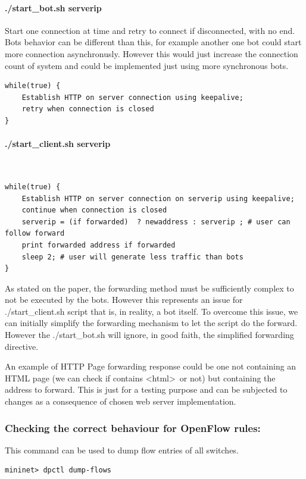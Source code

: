 \paragraph{./start\_bot.sh serverip}
Start one connection at time and retry to connect if disconnected, with no end. Bots behavior can be different than this, for example another one bot could start more connection asynchronusly. However this would just increase the connection count of system and could be implemented just using more synchronous bots.
\begin{lstlisting}[caption={./start\_bot.sh pseudo code},captionpos=b]
while(true) {
	Establish HTTP on server connection using keepalive;
	retry when connection is closed
}
\end{lstlisting}

\paragraph{./start\_client.sh serverip}\
\begin{lstlisting}[caption={./start\_client.sh pseudo code},captionpos=b]
while(true) {
	Establish HTTP on server connection on serverip using keepalive;
	continue when connection is closed
	serverip = (if forwarded)  ? newaddress : serverip ; # user can follow forward
	print forwarded address if forwarded
	sleep 2; # user will generate less traffic than bots
}

\end{lstlisting}

As stated on the paper, the forwarding method must be sufficiently complex to not be executed by the bots. However this represents an issue for ./start\_client.sh script that is, in reality, a bot itself. To overcome this issue, we can initially simplify the forwarding mechanism to let the script do the forward. However the ./start\_bot.sh will ignore, in good faith, the simplified forwarding directive.

An example of HTTP Page forwarding response could be one not containing an HTML page (we can check if contains \textless html\textgreater\ or not) but containing the address to forward. This is just for a testing purpose and can be subjected to changes as a consequence of chosen web server implementation.

\subsubsection{Checking the correct behaviour for OpenFlow rules:}
This command can be used to dump flow entries of all switches.
\begin{lstlisting}
mininet> dpctl dump-flows
\end{lstlisting}


